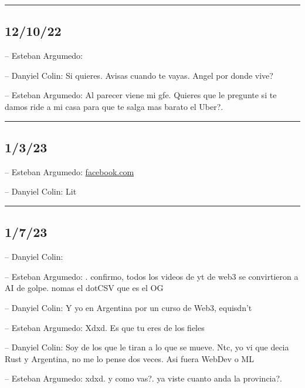 \begin{center}\rule{0.5\linewidth}{0.5pt}\end{center}

\hypertarget{section-172}{%
\subsection{12/10/22}\label{section-172}}

-- Esteban Argumedo:

-- Danyiel Colin: Si quieres. Avisas cuando te vayas. Angel por donde
vive?

-- Esteban Argumedo: Al parecer viene mi gfe. Quieres que le pregunte si
te damos ride a mi casa para que te salga mas barato el Uber?.

\begin{center}\rule{0.5\linewidth}{0.5pt}\end{center}

\hypertarget{section-173}{%
\subsection{1/3/23}\label{section-173}}

-- Esteban Argumedo:
\href{https://www.facebook.com/reel/927011034928741?mibextid=6AJuK9\&s=chYV2B\&fs=e}{facebook.com}

-- Danyiel Colin: Lit

\begin{center}\rule{0.5\linewidth}{0.5pt}\end{center}

\hypertarget{section-174}{%
\subsection{1/7/23}\label{section-174}}

-- Danyiel Colin:

-- Esteban Argumedo: . confirmo, todos los videos de yt de web3 se
convirtieron a AI de golpe. nomas el dotCSV que es el OG

-- Danyiel Colin: Y yo en Argentina por un curso de Web3, equisdn't

-- Esteban Argumedo: Xdxd. Es que tu eres de los fieles

-- Danyiel Colin: Soy de los que le tiran a lo que se mueve. Ntc, yo vi
que decia Rust y Argentina, no me lo pense dos veces. Asi fuera WebDev o
ML

-- Esteban Argumedo: xdxd. y como vas?. ya viste cuanto anda la
provincia?.

